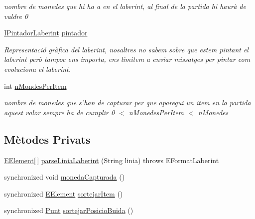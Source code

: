 \begin{DoxyCompactItemize}
\begin{DoxyCompactList}\small\item\em nombre de monedes que hi ha a en el laberint, al final de la partida hi haurà de valdre 0 \end{DoxyCompactList}\item 
\hypertarget{classlogica_1_1laberints_1_1_laberint_a4073632c1d1ab02ede9cddc2bbb6da2f}{\hyperlink{interfaceinterficie_1_1_i_pintador_laberint}{I\+Pintador\+Laberint} \hyperlink{classlogica_1_1laberints_1_1_laberint_a4073632c1d1ab02ede9cddc2bbb6da2f}{pintador}}\label{classlogica_1_1laberints_1_1_laberint_a4073632c1d1ab02ede9cddc2bbb6da2f}

\begin{DoxyCompactList}\small\item\em Representació gràfica del laberint, nosaltres no sabem sobre que estem pintant el laberint però tampoc ens importa, ens limitem a enviar missatges per pintar com evoluciona el laberint. \end{DoxyCompactList}\item 
\hypertarget{classlogica_1_1laberints_1_1_laberint_a65b89b5e73ed4533df3a8c2296e492be}{int \hyperlink{classlogica_1_1laberints_1_1_laberint_a65b89b5e73ed4533df3a8c2296e492be}{n\+Mondes\+Per\+Item}}\label{classlogica_1_1laberints_1_1_laberint_a65b89b5e73ed4533df3a8c2296e492be}

\begin{DoxyCompactList}\small\item\em nombre de monedes que s'han de capturar per que aparegui un item en la partida aquest valor sempre ha de cumplir 0 $<$ n\+Monedes\+Per\+Item $<$ n\+Monedes \end{DoxyCompactList}\end{DoxyCompactItemize}
\subsection*{Mètodes Privats}
\begin{DoxyCompactItemize}
\item 
\hyperlink{enumlogica_1_1enumeracions_1_1_e_element}{E\+Element}\mbox{[}$\,$\mbox{]} \hyperlink{classlogica_1_1laberints_1_1_laberint_a169bd589975b1327331e7a1eae4572fe}{parse\+Linia\+Laberint} (String linia)  throws E\+Format\+Laberint
\item 
synchronized void \hyperlink{classlogica_1_1laberints_1_1_laberint_aea46b09409281ac15ec047be67e3783b}{moneda\+Capturada} ()
\item 
synchronized \hyperlink{enumlogica_1_1enumeracions_1_1_e_element}{E\+Element} \hyperlink{classlogica_1_1laberints_1_1_laberint_ae3ff642041796463caa7941da26ab2d3}{sortejar\+Item} ()
\item 
synchronized \hyperlink{classlogica_1_1_punt}{Punt} \hyperlink{classlogica_1_1laberints_1_1_laberint_a93b11d0cb50551875d8f9b8ae92a2d45}{sortejar\+Posicio\+Buida} ()
\end{DoxyCompactItemize}


